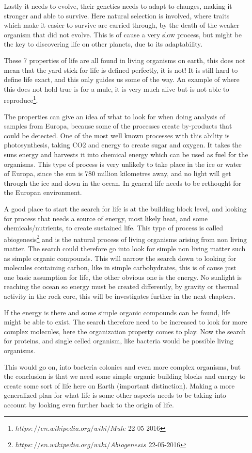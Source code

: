 Lastly it needs to evolve, their genetics needs to adapt to changes, making it stronger and able to survive. Here natural selection is involved, where traits which make it easier to survive are carried through, by the death of the weaker organism that did not evolve. This is of cause a very slow process, but might be the key to discovering life on other planets, due to its adaptability.\par
These 7 properties of life are all found in living organisms on earth, this does not mean that the yard stick for life is defined perfectly, it is not! It is still hard to define life exact, and this only guides us some of the way. An example of where this does not hold true is for a mule, it is very much alive but is not able to reproduce\footnote{$https://en.wikipedia.org/wiki/Mule$ 22-05-2016}. \par
The properties can give an idea of what to look for when doing analysis of samples from Europa, because some of the processes create by-products that could be detected. One of the most well known processes with this ability is photosynthesis, taking CO2 and energy to create sugar and oxygen. It takes the suns energy and harvests it into chemical energy which can be used as fuel for the organisms. This type of process is very unlikely to take place in the ice or water of Europa, since the sun is 780 million kilometres away, and no light will get through the ice and down in the ocean. In general life needs to be rethought for the Europan environment.  \par
A good place to start the search for life is at the building block level, and looking for process that needs a source of energy, most likely heat, and some chemicals/nutrients, to create sustained life. This type of process is called abiogenesis\footnote{$https://en.wikipedia.org/wiki/Abiogenesis$ 22-05-2016} and is the natural process of living organisms arising from non living matter. The search could therefore go into look for simple non living matter such as simple organic compounds. This will narrow the search down to looking for molecules containing carbon, like in simple carbohydrates, this is of cause just one basic assumption for life, the other obvious one is the energy. No sunlight is reaching the ocean so energy must be created differently, by gravity or thermal activity in the rock core, this will be investigates further in the next chapters. \par
If the energy is there and some simple organic compounds can be found, life might be able to exist. The search therefore need to be increased to look for more complex molecules, here the organization property comes to play.  Now the search for proteins, and single celled organism, like bacteria would be possible living organisms.\par
This would go on, into bacteria colonies and even more complex organisms, but the conclusion is that we need some simple organic building blocks and energy to create some sort of life here on Earth (important distinction). Making a more generalized plan for what life is some other aspects needs to be taking into account by looking even further back to the origin of life.

